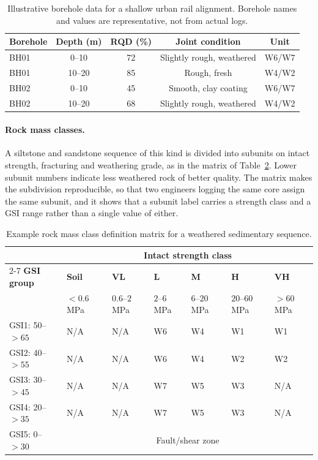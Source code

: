 \begin{table}[htbp]
\caption{Illustrative borehole data for a shallow urban rail alignment. Borehole names and values are representative, not from actual logs.}
\label{tab:borehole}
\centering
\small
\begin{tabular}{lcccc}
\toprule
\textbf{Borehole} & \textbf{Depth (m)} & \textbf{RQD (\%)} & \textbf{Joint condition} & \textbf{Unit} \\
\midrule
BH01 & 0--10 & 72 & Slightly rough, weathered & W6/W7 \\
BH01 & 10--20 & 85 & Rough, fresh & W4/W2 \\
BH02 & 0--10 & 45 & Smooth, clay coating & W6/W7 \\
BH02 & 10--20 & 68 & Slightly rough, weathered & W4/W2 \\
\bottomrule
\end{tabular}
\end{table}

\paragraph{Rock mass classes.}
A siltstone and sandstone sequence of this kind is divided into subunits on
intact strength, fracturing and weathering grade, as in the matrix of
Table~\ref{tab:class-matrix}. Lower subunit numbers indicate less weathered
rock of better quality. The matrix makes the subdivision reproducible, so
that two engineers logging the same core assign the same subunit, and it
shows that a subunit label carries a strength class and a GSI range rather
than a single value of either.

\begin{table}[htbp]
\caption{Example rock mass class definition matrix for a weathered sedimentary sequence.}
\label{tab:class-matrix}
\centering
\small
\begin{tabularx}{\textwidth}{l X X X X X X}
\toprule
 & \multicolumn{6}{c}{\textbf{Intact strength class}} \\
\cmidrule(lr){2-7}
\textbf{GSI group} & \textbf{Soil} & \textbf{VL} & \textbf{L} & \textbf{M} & \textbf{H} & \textbf{VH} \\
 & $<0.6$ MPa & $0.6$--$2$ MPa & $2$--$6$ MPa & $6$--$20$ MPa & $20$--$60$ MPa & $>60$ MPa \\
\midrule
GSI1: 50--$>65$ & N/A & N/A & W6 & W4 & W1 & W1 \\
GSI2: 40--$>55$ & N/A & N/A & W6 & W4 & W2 & W2 \\
GSI3: 30--$>45$ & N/A & N/A & W7 & W5 & W3 & N/A \\
GSI4: 20--$>35$ & N/A & N/A & W7 & W5 & W3 & N/A \\
GSI5: 0--$>30$ & \multicolumn{6}{c}{Fault/shear zone} \\
\bottomrule
\end{tabularx}
\end{table}


